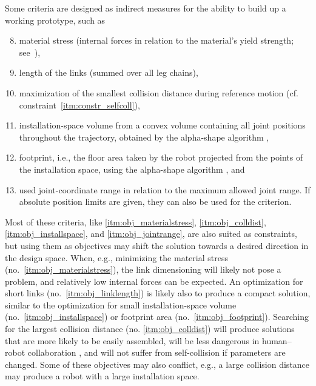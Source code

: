 Some criteria are designed as indirect measures for the ability to build up a working prototype, such as
\begin{enumerate}
  \setcounter{enumi}{7}
  \item \label{itm:obj_materialstress} material stress (internal forces in relation to the material's yield strength; see~\cite{SchapplerOrt2020}),
  \item \label{itm:obj_linklength} length of the links (summed over all leg chains),
  \item \label{itm:obj_colldist} maximization of the smallest collision distance during reference motion (cf. constraint~\ref{itm:constr_selfcoll}),
  \item \label{itm:obj_installspace} installation-space volume from a convex volume containing all joint positions throughout the trajectory, obtained by the alpha-shape algorithm \cite{MatlabAS},
  \item \label{itm:obj_footprint} footprint, i.e., the floor area taken by the robot projected from the points of the installation space, using the alpha-shape algorithm \cite{MatlabAS}, and
  \item \label{itm:obj_jointrange} used joint-coordinate range in relation to the maximum allowed joint range. If absolute position limits are given, they can also be used for the criterion.
\end{enumerate}

\newpage %
Most %
%
of these criteria, like \ref*{itm:obj_materialstress}, \ref*{itm:obj_colldist}, \ref*{itm:obj_installspace}, and \ref*{itm:obj_jointrange}, are also suited as constraints, but using them as objectives may shift the solution towards a desired direction in the design space.
When, e.g., minimizing the material stress (no.~\ref*{itm:obj_materialstress}), the link dimensioning will likely not pose a problem, and relatively low internal forces can be expected.
An optimization for short links (no.~\ref*{itm:obj_linklength}) is likely also to produce a compact solution, similar to the optimization for small installation-space volume (no.~\ref*{itm:obj_installspace}) or footprint area (no.~\ref*{itm:obj_footprint}).
Searching for the largest collision distance (no. \ref*{itm:obj_colldist}) will produce solutions that are more likely to be easily assembled, will be less dangerous in human--robot collaboration \cite{MohammadSeeSch2024}, and will not suffer from self-collision if parameters are changed.
Some of these objectives may also conflict, e.g., a large collision distance may produce a robot with a large installation space.

